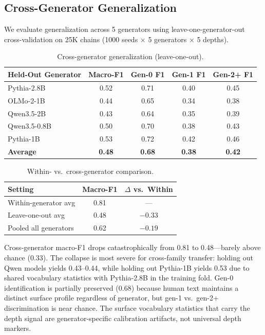 \documentclass[letterpaper]{article}
\begin{document}
\subsection{Cross-Generator Generalization}
\label{sec:crossgen}

We evaluate generalization across 5 generators using leave-one-generator-out cross-validation on 25K chains (1000 seeds $\times$ 5 generators $\times$ 5 depths).

\begin{table}[h]
\centering
\caption{Cross-generator generalization (leave-one-out).}
\label{tab:crossgen}
\begin{tabular}{lcccc}
\toprule
Held-Out Generator & Macro-F1 & Gen-0 F1 & Gen-1 F1 & Gen-2+ F1 \\
\midrule
Pythia-2.8B & 0.52 & 0.71 & 0.40 & 0.45 \\
OLMo-2-1B & 0.44 & 0.65 & 0.34 & 0.38 \\
Qwen3.5-2B & 0.43 & 0.64 & 0.35 & 0.39 \\
Qwen3.5-0.8B & 0.50 & 0.70 & 0.38 & 0.43 \\
Pythia-1B & 0.53 & 0.72 & 0.42 & 0.46 \\
\midrule
\textbf{Average} & \textbf{0.48} & \textbf{0.68} & \textbf{0.38} & \textbf{0.42} \\
\bottomrule
\end{tabular}
\end{table}

\begin{table}[h]
\centering
\caption{Within- vs.\ cross-generator comparison.}
\label{tab:within_vs_cross}
\begin{tabular}{lcc}
\toprule
Setting & Macro-F1 & $\Delta$ vs.\ Within \\
\midrule
Within-generator avg & 0.81 & --- \\
Leave-one-out avg & 0.48 & $-0.33$ \\
Pooled all generators & 0.62 & $-0.19$ \\
\bottomrule
\end{tabular}
\end{table}

Cross-generator macro-F1 drops catastrophically from 0.81 to 0.48---barely above chance (0.33). The collapse is most severe for cross-family transfer: holding out Qwen models yields 0.43--0.44, while holding out Pythia-1B yields 0.53 due to shared vocabulary statistics with Pythia-2.8B in the training fold. Gen-0 identification is partially preserved (0.68) because human text maintains a distinct surface profile regardless of generator, but gen-1 vs.\ gen-2+ discrimination is near chance. The surface vocabulary statistics that carry the depth signal are generator-specific calibration artifacts, not universal depth markers.
\end{document}
